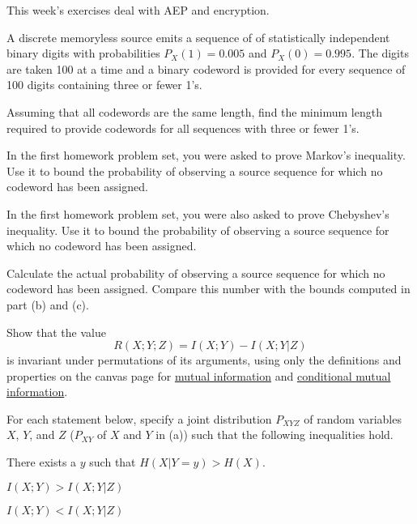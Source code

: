 \documentclass[a4paper,10pt,landscape,twocolumn]{scrartcl}
\begin{document}
\practiceproblems

{\sffamily\noindent
This week's exercises deal with AEP and encryption.  \practiceinstructions
}

\begin{exercise}
A discrete memoryless source emits a sequence of of statistically independent binary digits with probabilities $P_X(1) = 0.005$ and $P_X(0) = 0.995$. The digits are taken 100 at a time and a binary codeword is provided for every sequence of 100 digits containing three or fewer 1's.
	\begin{subex}
	Assuming that all codewords are the same length, find the minimum length required to
provide codewords for all sequences with three or fewer 1's.
	\end{subex}
	\begin{subex}
		In the first homework problem set, you were asked to prove Markov's inequality.
		Use it to bound the probability of observing a source sequence for
		which no codeword has been assigned.
	\end{subex}
    \begin{subex}
    	In the first homework problem set, you were also asked to
        prove Chebyshev's inequality. Use it to bound the probability of observing a source sequence for
		which no codeword has been assigned.
	\begin{subex}
	Calculate the actual probability of observing a source sequence for which no codeword has
been assigned. Compare this number with the bounds computed
in part (b) and (c).
	\end{subex}
	\end{subex}
\end{exercise}



\begin{exercise}
Show that the value
\[
R(X;Y;Z) = I(X;Y) - I(X;Y|Z)
\]
is invariant under permutations of its arguments, using only the definitions and properties on the canvas page for \href{https://canvas.uva.nl/courses/2205/pages/definition-mutual-information?module_item_id=17286}{mutual information} and \href{https://canvas.uva.nl/courses/2205/pages/definition-conditional-mutual-information?module_item_id=26474}{conditional mutual information}.
\end{exercise}

\begin{exercise}[]
For each statement below, specify a joint distribution $P_{XYZ}$ of random variables $X$, $Y$, and $Z$ ($P_{XY}$ of $X$ and $Y$ in (a)) such that the following inequalities hold.
\begin{subex}
There exists a $y$ such that $H(X|Y=y) > H(X)$.
\end{subex}
\begin{subex}
$I(X;Y) > I(X;Y|Z)$
\end{subex}
\begin{subex}
$I(X;Y) < I(X;Y|Z)$
\end{subex}
\end{exercise}
\end{document}
